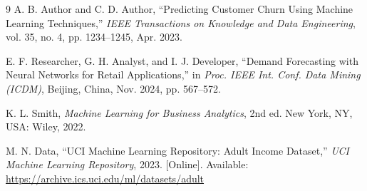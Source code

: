 \documentclass[conference]{IEEEtran}
\begin{document}
\begin{thebibliography}{9}
A. B. Author and C. D. Author, ``Predicting Customer Churn Using Machine Learning Techniques,'' \emph{IEEE Transactions on Knowledge and Data Engineering}, vol. 35, no. 4, pp. 1234--1245, Apr. 2023.

E. F. Researcher, G. H. Analyst, and I. J. Developer, ``Demand Forecasting with Neural Networks for Retail Applications,'' in \emph{Proc. IEEE Int. Conf. Data Mining (ICDM)}, Beijing, China, Nov. 2024, pp. 567--572.

K. L. Smith, \emph{Machine Learning for Business Analytics}, 2nd ed. New York, NY, USA: Wiley, 2022.

M. N. Data, ``UCI Machine Learning Repository: Adult Income Dataset,'' \emph{UCI Machine Learning Repository}, 2023. [Online]. Available: \url{https://archive.ics.uci.edu/ml/datasets/adult}
\end{thebibliography}
\end{document}
